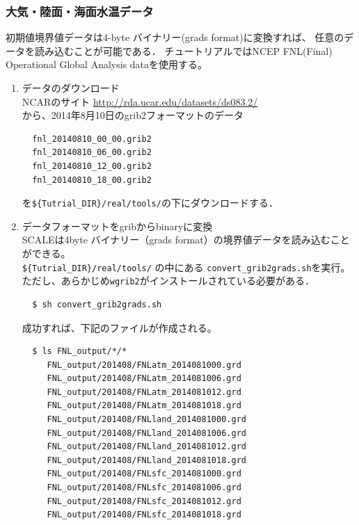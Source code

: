 \subsubsection{大気・陸面・海面水温データ}
\label{sec:real_prep}
初期値境界値データは4-byte バイナリー(grads format)に変換すれば、
任意のデータを読み込むことが可能である．
チュートリアルではNCEP FNL(Final) Operational Global Analysis dataを使用する。
\begin{enumerate}
\item データのダウンロード\\
NCARのサイト
 \url{http://rda.ucar.edu/datasets/ds083.2/}\\
から、2014年8月10日のgrib2フォーマットのデータ
\begin{verbatim}
  fnl_20140810_00_00.grib2
  fnl_20140810_06_00.grib2
  fnl_20140810_12_00.grib2
  fnl_20140810_18_00.grib2
\end{verbatim}
を\verb|${Tutrial_DIR}/real/tools/|の下にダウンロードする．

\item データフォーマットをgribからbinaryに変換\\
 SCALEは4byte バイナリー（grads format）の境界値データを読み込むことができる。\\
\verb|${Tutrial_DIR}/real/tools/| の中にある \verb|convert_grib2grads.sh|を実行。
ただし、あらかじめ\verb|wgrib2|がインストールされている必要がある．
\begin{verbatim}
  $ sh convert_grib2grads.sh
\end{verbatim}
成功すれば、下記のファイルが作成される。
\begin{verbatim}
  $ ls FNL_output/*/*
     FNL_output/201408/FNLatm_2014081000.grd
     FNL_output/201408/FNLatm_2014081006.grd
     FNL_output/201408/FNLatm_2014081012.grd
     FNL_output/201408/FNLatm_2014081018.grd
     FNL_output/201408/FNLland_2014081000.grd
     FNL_output/201408/FNLland_2014081006.grd
     FNL_output/201408/FNLland_2014081012.grd
     FNL_output/201408/FNLland_2014081018.grd
     FNL_output/201408/FNLsfc_2014081000.grd
     FNL_output/201408/FNLsfc_2014081006.grd
     FNL_output/201408/FNLsfc_2014081012.grd
     FNL_output/201408/FNLsfc_2014081018.grd
\end{verbatim}
\end{enumerate}

